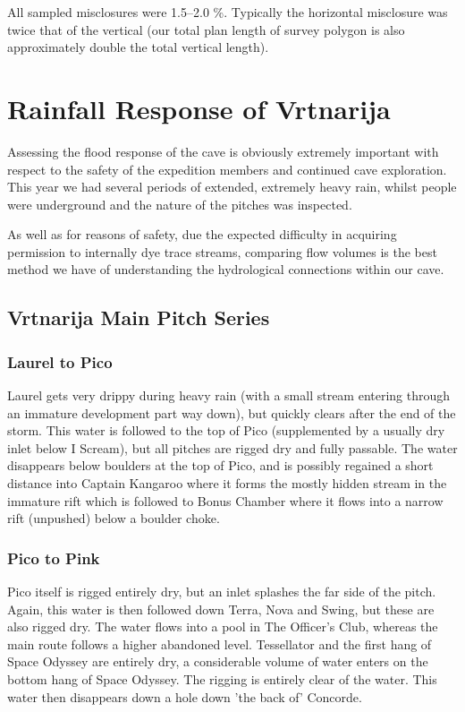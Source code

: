 \documentclass[english,a4]{article}
\begin{document}
All sampled misclosures were 1.5--2.0 \%. Typically the horizontal misclosure
was twice that of the vertical (our total plan length of survey polygon is also
approximately double the total vertical length).


\section{Rainfall Response of Vrtnarija}

Assessing the flood response of the cave is obviously extremely important
with respect to the safety of the expedition members and continued
cave exploration. This year we had several periods of extended, extremely
heavy rain, whilst people were underground and the nature of the pitches
was inspected.

As well as for reasons of safety, due the expected difficulty in acquiring
permission to internally dye trace streams, comparing flow volumes
is the best method we have of understanding the hydrological connections
within our cave.

\subsection{Vrtnarija Main Pitch Series}

\subsubsection{Laurel to Pico}

Laurel gets very drippy during heavy rain (with a small stream entering through
an immature development part way down), but quickly clears after the end of the
storm. This water is followed to the top of Pico (supplemented by a usually dry
inlet below I Scream), but all pitches are rigged dry and fully passable. 
The water disappears below boulders at the top of Pico, and is possibly
regained a short distance into Captain Kangaroo where it forms the mostly
hidden stream in the immature rift which is followed to Bonus Chamber where it
flows into a narrow rift (unpushed) below a boulder choke.

\subsubsection{Pico to Pink}

Pico itself is rigged entirely dry, but an inlet splashes the far side of the
pitch. Again, this water is then followed down Terra, Nova and Swing, but these
are also rigged dry. The water flows into a pool in The Officer's Club, whereas
the main route follows a higher abandoned level. Tessellator and the first hang
of Space Odyssey are entirely dry, a considerable volume of water enters on the
bottom hang of Space Odyssey. The rigging is entirely clear of the
water. This water then disappears down a hole down 'the back of' Concorde.
\end{document}
